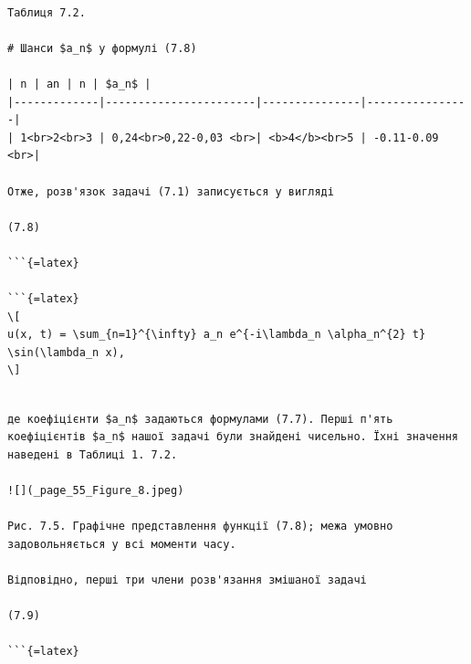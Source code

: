 \documentclass[
]{article}
\begin{document}
\begin{verbatim}

Таблиця 7.2.

# Шанси $a_n$ у формулі (7.8)

| n | an | n | $a_n$ |
|-------------|-----------------------|---------------|----------------|
| 1<br>2<br>3 | 0,24<br>0,22-0,03 <br>| <b>4</b><br>5 | -0.11-0.09 <br>|

Отже, розв'язок задачі (7.1) записується у вигляді

(7.8)

```{=latex}

```{=latex}
\[
u(x, t) = \sum_{n=1}^{\infty} a_n e^{-i\lambda_n \alpha_n^{2} t} \sin(\lambda_n x),
\]
\end{verbatim}

\begin{verbatim}

де коефіцієнти $a_n$ задаються формулами (7.7). Перші п'ять коефіцієнтів $a_n$ нашої задачі були знайдені чисельно. Їхні значення наведені в Таблиці 1. 7.2.

![](_page_55_Figure_8.jpeg)

Рис. 7.5. Графічне представлення функції (7.8); межа умовно задовольняється у всі моменти часу.

Відповідно, перші три члени розв'язання змішаної задачі

(7.9)

```{=latex}


\end{verbatim}
\end{document}

